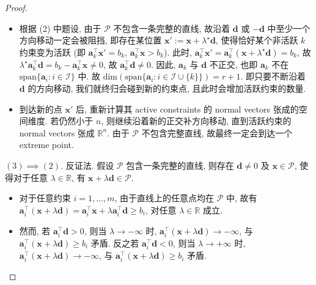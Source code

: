 \begin{thmblock}
\begin{proof}{}
\begin{itemize}
\begin{itemize}
\[
  \bm{a}_j^\top \bm{y} - b_j = \bm{a}_j^\top (\bm{x} + \lambda \bm{d}) - b_j = \bm{s}_j + \lambda \bm{a}_j^\top \bm{d} > 0.
\]

即, 沿着 $\bm{d}$ 的方向移动, 非活跃约束在小范围内依然保持非活跃.


\end{itemize}


\item {}根据 (2) 中题设, 由于 $\mathcal{P}$ 不包含一条完整的直线, 故沿着 $\bm{d}$ 或 $-\bm{d}$ 中至少一个方向移动一定会被阻挡, 即存在某位置 $\bm{x}' := \bm{x} + \lambda^\star \bm{d}$, 使得恰好某个非活跃 $k$ 约束变为活跃 (即 $\bm{a}_k^\top \bm{x}' = b_k$, $\bm{a}_k^\top \bm{x} > b_k$). 此时, $\bm{a}_k^\top \bm{x}' = \bm{a}_k^\top (\bm{x} + \lambda^\star \bm{d}) = b_k$, 故 $\lambda^\star \bm{a}_k^\top \bm{d} = b_k - \bm{a}_k^\top \bm{x} \neq 0$, 故 $\bm{a}_k^\top \bm{d} \neq 0$. 因此, $\bm{a}_k$ 与 $\bm{d}$ 不正交, 也即 $\bm{a}_k$ 不在 $\text{span}\{\bm{a}_i: i \in \mathcal{I}\}$ 中. 故 $\text{dim}(\text{span}\{\bm{a}_i: i \in \mathcal{I} \cup \{k\}\}) = r + 1$. 即只要不断沿着 $\bm{d}$ 的方向移动, 我们就终归会碰到新的约束点, 且此时会增加活跃约束的数量.


\item {}到达新的点 $\bm{x}'$ 后, 重新计算其 active constraints 的 normal vectors 张成的空间维度. 若仍然小于 $n$, 则继续沿着新的正交补方向移动, 直到活跃约束的 normal vectors 张成 $\mathbb{R}^n$. 由于 $\mathcal{P}$ 不包含完整直线, 故最终一定会到达一个 extreme point.


\end{itemize}

\textbf{$(3) \implies (2)$}. 反证法. 假设 $\mathcal{P}$ 包含一条完整的直线, 则存在 $\bm{d} \neq 0$ 及 $\bm{x} \in \mathcal{P}$, 使得对于任意 $\lambda \in \mathbb{R}$, 有 $\bm{x} + \lambda \bm{d} \in \mathcal{P}$.

\begin{itemize}
\item {}对于任意约束 $i = 1, \dots, m$, 由于直线上的任意点均在 $\mathcal{P}$ 中, 故有 $\bm{a}_i^\top (\bm{x} + \lambda \bm{d}) = \bm{a}_i^\top \bm{x}+ \lambda \bm{a}_i^\top \bm{d} \geq b_i$, 对任意 $\lambda \in \mathbb{R}$ 成立.


\item {}然而, 若 $\bm{a}_i^\top \bm{d} > 0$, 则当 $\lambda \to -\infty$ 时, $\bm{a}_i^\top (\bm{x} + \lambda \bm{d}) \to -\infty$, 与 $\bm{a}_i^\top (\bm{x} + \lambda \bm{d}) \geq b_i$ 矛盾. 反之若 $\bm{a}_i^\top \bm{d} < 0$, 则当 $\lambda \to +\infty$ 时, $\bm{a}_i^\top (\bm{x} + \lambda \bm{d}) \to -\infty$, 与 $\bm{a}_i^\top (\bm{x} + \lambda \bm{d}) \geq b_i$ 矛盾.



\end{itemize}
\end{proof}
\end{thmblock}
